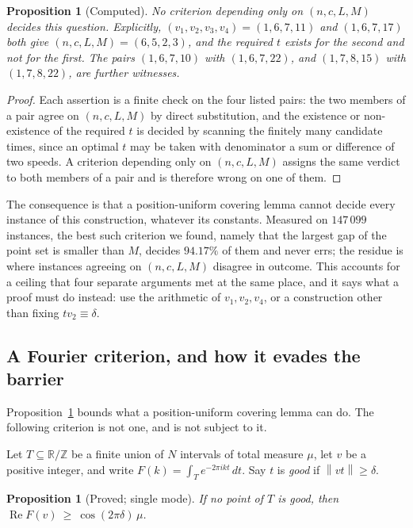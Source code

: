 \documentclass[11pt]{amsart}
\theoremstyle{plain}
\newtheorem{proposition}[theorem]{Proposition}
\theoremstyle{definition}
\newcommand{\nrm}[1]{\left\lVert #1 \right\rVert}
\newcommand{\Z}{\mathbb{Z}}
\newcommand{\R}{\mathbb{R}}
\begin{document}
\begin{proposition}[Computed]\label{prop:barrier}
No criterion depending only on $(n,c,L,M)$ decides this question. Explicitly,
$(v_1,v_2,v_3,v_4)=(1,6,7,11)$ and $(1,6,7,17)$ both give $(n,c,L,M)=(6,5,2,3)$, and the required
$t$ exists for the second and not for the first. The pairs $(1,6,7,10)$ with $(1,6,7,22)$, and
$(1,7,8,15)$ with $(1,7,8,22)$, are further witnesses.
\end{proposition}

\begin{proof}
Each assertion is a finite check on the four listed pairs: the two members of a pair agree on
$(n,c,L,M)$ by direct substitution, and the existence or non-existence of the required $t$ is
decided by scanning the finitely many candidate times, since an optimal $t$ may be taken with
denominator a sum or difference of two speeds. A criterion depending only on $(n,c,L,M)$ assigns
the same verdict to both members of a pair and is therefore wrong on one of them.
\end{proof}

The consequence is that a position-uniform covering lemma cannot decide every instance of this
construction, whatever its constants. Measured on $147\,099$ instances, the best such criterion we
found, namely that the largest gap of the point set is smaller than $M$, decides $94.17\%$ of them
and never errs; the residue is where instances agreeing on $(n,c,L,M)$ disagree in outcome. This
accounts for a ceiling that four separate arguments met at the same place, and it says what a proof
must do instead: use the arithmetic of $v_1,v_2,v_4$, or a construction other than fixing
$tv_2\equiv\delta$.

\subsection{A Fourier criterion, and how it evades the barrier}\label{sec:fourier}

Proposition~\ref{prop:barrier} bounds what a position-uniform covering lemma can do. The following
criterion is not one, and is not subject to it.

Let $T\subseteq\R/\Z$ be a finite union of $N$ intervals of total measure $\mu$, let $v$ be a
positive integer, and write $F(k)=\int_T e^{-2\pi ikt}\,dt$. Say $t$ is \emph{good} if
$\nrm{vt}\ge\delta$.

\begin{proposition}[Proved; single mode]\label{prop:fourier1}
If no point of $T$ is good, then $\operatorname{Re}F(v)\ \ge\ \cos(2\pi\delta)\,\mu$.
\end{proposition}
\end{document}
